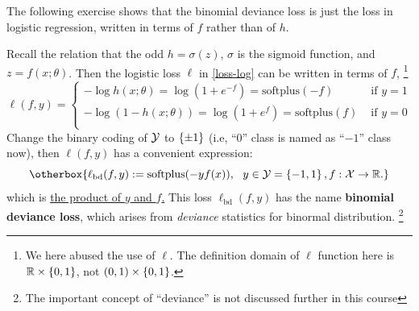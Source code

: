 \documentclass[english,handout]{beamer}
\begin{document}




 \begin{frame}
 The following exercise shows that
 the binomial deviance loss
 is just the loss in logistic regression,
 written in terms of $f$ rather than of $h$.
 \begin{ex}
 Recall the relation that
 the odd $h=\sigma(z)$,
 $\sigma$ is the sigmoid function,
 and $z=f(x;\theta)$. Then  the logistic loss
 $\ell$ in \eqref{loss-log} can be written
 in terms of $f$,
 \footnote{  
 We here abused the use of $\ell$.
 The  definition domain of $\ell$ function here is ${\mathbb{R}}\times \left\{0,1\right\}$,
 not $(0,1)\times \left\{0,1\right\}$.
  }
\begin{equation}
\ell(f,y)= \begin{cases}
-\log  h(x;\theta) = \log (1+e^{-f})
=\mbox{softplus}(-f) & \mbox{ if } y=1 \\
-\log  (1-h(x;\theta) ) = \log (1+e^f) 
=\mbox{softplus}(f)& \mbox{ if } y=0 \\
\end{cases}
\end{equation}
Change the  binary coding of $\mathcal{Y}$
to $\left\{\pm 1\right\}$
(i.e, ``$0$'' class is named as ``$-1$'' class now), then 
$\ell(f,y)$ has a convenient expression:
\begin{equation}
\otherbox{
\ell_{\text{bd}}(f,y):= \mbox{softplus} (-y f(x)), ~~
y\in\Ycal =\set{-1,1}, f : \Xcal \to \Real.
}
\end{equation}
which is 
\underline{ the product of $y$ and $f$.}
This loss
$\ell_{\text{bd}}(f,y)$ has the name
{\bf binomial deviance loss}, which 
arises from {\em deviance} statistics for binormal distribution.
\footnote{ 
The important concept of 
``deviance'' is not discussed further in this course
}
 \end{ex}
 \end{frame}
\end{document}
